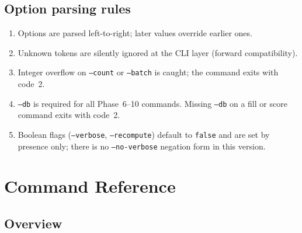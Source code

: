\documentclass[11pt,letterpaper]{article}
\begin{document}
\subsection{Option parsing rules}

\begin{enumerate}[leftmargin=2em]
  \item Options are parsed left-to-right; later values override earlier ones.
  \item Unknown tokens are silently ignored at the CLI layer (forward
		compatibility).
  \item Integer overflow on \texttt{--count} or \texttt{--batch} is caught;
		the command exits with code~2.
  \item \texttt{--db} is required for all Phase~6--10 commands.  Missing
		\texttt{--db} on a fill or score command exits with code~2.
  \item Boolean flags (\texttt{--verbose}, \texttt{--recompute}) default to
		\texttt{false} and are set by presence only; there is no
		\texttt{--no-verbose} negation form in this version.
\end{enumerate}

\section{Command Reference}
\label{sec:commands}

\subsection{Overview}
\end{document}
